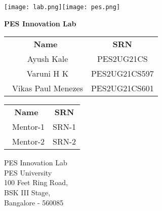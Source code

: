 \documentclass[12pt]{report}
\begin{document}
 

\begin{titlepage}
\texttt{[image: lab.png]}\hfill \texttt{[image: pes.png]}

\begin{center}
\vspace*{1cm}

\textbf{\Large{PES Innovation Lab}}

\vspace{0.3cm}
\vspace{0.1cm}
       
       
\vspace{0.8cm}
            
\vspace{0.8cm}
       
\vspace{0.2cm}
       
\begin{tabular}{c c}    
    \textbf{Name} & 
    \textbf{SRN} \\[0.5cm]
    \ {Ayush Kale} & {PES2UG21CS} \\
    \ {Varuni H K} & {PES2UG21CS597} \\
    \ {Vikas Paul Menezes} & {PES2UG21CS601} \\         
\end{tabular}
\vspace{0.5cm}

\vspace{0.2cm}
       
\begin{tabular}{c c}
    \textbf{Name} & 
    \textbf{SRN} \\[0.5cm]
    \ {Mentor-1} & {SRN-1} \\
    \ {Mentor-2} & {SRN-2} \\
\end{tabular}
       
\vfill
\vspace{0.5cm}
            
PES Innovation Lab\\
PES University\\
100 Feet Ring Road,\\
BSK III Stage,\\
Bangalore - 560085
            
\end{center}
\end{titlepage}
\end{document}
